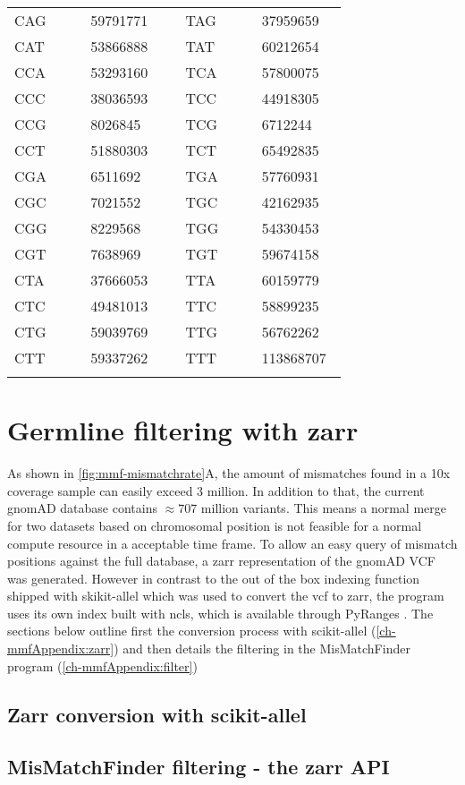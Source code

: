 \begin{table}[!ht]
\begin{tabular}{|C{0.2\linewidth} | R{0.15\linewidth}| C{0.04\linewidth} |C{0.2\linewidth} | R{0.15\linewidth}|}
CAG & \num{ 59791771} &  &TAG & \num{ 37959659} \\
CAT & \num{ 53866888} &  &TAT & \num{ 60212654} \\
CCA & \num{ 53293160} &  &TCA & \num{ 57800075} \\
CCC & \num{ 38036593} &  &TCC & \num{ 44918305} \\
CCG & \num{ 8026845} &  &TCG & \num{ 6712244} \\
CCT & \num{ 51880303} &  &TCT & \num{ 65492835} \\
CGA & \num{ 6511692} &  &TGA & \num{ 57760931} \\
CGC & \num{ 7021552} &  &TGC & \num{ 42162935} \\
CGG & \num{ 8229568} &  &TGG & \num{ 54330453} \\
CGT & \num{ 7638969} &  &TGT & \num{ 59674158} \\
CTA & \num{ 37666053} &  &TTA & \num{ 60159779} \\
CTC & \num{ 49481013} &  &TTC & \num{ 58899235} \\
CTG & \num{ 59039769} &  &TTG & \num{ 56762262} \\
CTT & \num{ 59337262} &  &TTT & \num{ 113868707} \\
\hhline{|-|-|~|-|-|}
\bottomrule
\end{tabular}
\end{table}


\section{Germline filtering with zarr}
\label{ch-mmfAppendix:germlineFilter}
As shown in \autoref{fig:mmf-mismatchrate}A, the amount of mismatches found in a 10x coverage sample can easily exceed $3$ million. In addition to that, the current gnomAD database contains $ \approx 707$ million variants. This means a normal merge for two datasets based on chromosomal position is not feasible for a normal compute resource in a acceptable time frame. To allow an easy query of mismatch positions against the full database, a zarr \cite{Miles2021}representation of the gnomAD VCF was generated. However in contrast to the out of the box indexing function shipped with skikit-allel \cite{Miles2021a} which was used to convert the vcf to zarr, the program uses its own index built with ncls, which is available through PyRanges \cite{Stovner2019}. The sections below outline first the conversion process with scikit-allel (\autoref{ch-mmfAppendix:zarr}) and then details the filtering in the MisMatchFinder program (\autoref{ch-mmfAppendix:filter})

\subsection{Zarr conversion with scikit-allel}
\label{ch-mmfAppendix:zarr}


\subsection{MisMatchFinder filtering - the zarr API}
\label{ch-mmfAppendix:filter}
